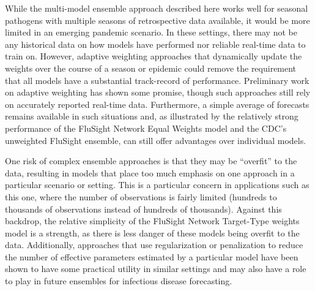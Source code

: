 \documentclass{article}\usepackage[]{graphicx}\usepackage[]{color}
\begin{document}


While the multi-model ensemble approach described here works well for seasonal pathogens with multiple seasons of retrospective data available, it would be more limited in an emerging pandemic scenario.
In these settings, there may not be any historical data on how models have performed nor reliable real-time data to train on.
However, adaptive weighting approaches that dynamically update the weights over the course of a season or epidemic could remove the requirement that all models have a substantial track-record of performance. 
Preliminary work on adaptive weighting has shown some promise, though such approaches still rely on accurately reported real-time data.\cite{mcandrew2019adaptively}
Furthermore, a simple average of forecasts remains available in such situations and, as illustrated by the relatively strong performance of the FluSight Network Equal Weights model and the CDC's unweighted FluSight ensemble, can still offer advantages over individual models.

One risk of complex ensemble approaches is that they may be ``overfit'' to the data, resulting in models that place too much emphasis on one approach in a particular scenario or setting.
This is a particular concern in applications such as this one, where the number of observations is fairly limited (hundreds to thousands of observations instead of hundreds of thousands).
Against this backdrop, the relative simplicity of the FluSight Network Target-Type weights model is a strength, as there is less danger of these models being overfit to the data.
Additionally, approaches that use regularization or penalization to reduce the number of effective parameters estimated by a particular model have been shown to have some practical utility in similar settings and may also have a role to play in future ensembles for infectious disease forecasting.\cite{Ray2018}
\end{document}
